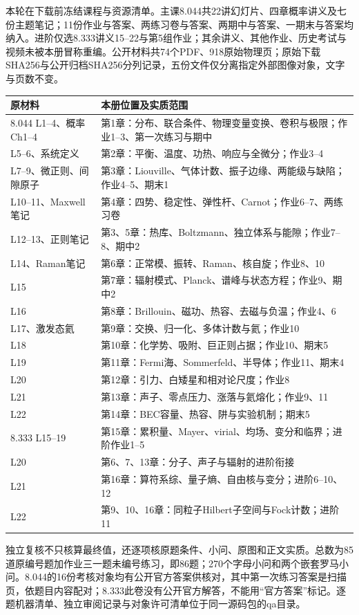 本轮在下载前冻结课程与资源清单。主课8.044共22讲幻灯片、四章概率讲义及七份主题笔记；11份作业与答案、两练习卷与答案、两期中与答案、一期末与答案均纳入。进阶仅选8.333讲义15--22与第5组作业；其余讲义、其他作业、历史考试与视频未被本册冒称重编。公开材料共74个PDF、918原始物理页；原始下载SHA256与公开归档SHA256分列记录，五份文件仅分离指定外部图像对象，文字与页数不变。

\begin{longtable}{p{}p{}}
\toprule 原材料 & 本册位置及实质范围\\\midrule\endhead
8.044 L1--4、概率Ch1--4 & 第1章：分布、联合条件、物理变量变换、卷积与极限；作业1--3、第一次练习与期中\\
L5--6、系统定义 & 第2章：平衡、温度、功热、响应与全微分；作业3--4\\
L7--9、微正则、间隙原子 & 第3章：Liouville、气体计数、振子边缘、两能级与缺陷；作业4--5、期末1\\
L10--11、Maxwell笔记 & 第4章：四势、稳定性、弹性杆、Carnot；作业6--7、两练习卷\\
L12--13、正则笔记 & 第3、5章：热库、Boltzmann、独立体系与能隙；作业7--8、期中2\\
L14、Raman笔记 & 第6章：正常模、振转、Raman、核自旋；作业8、10\\
L15 & 第7章：辐射模式、Planck、谱峰与状态方程；作业9、期中2\\
L16 & 第8章：Brillouin、磁功、热容、去磁与负温；作业4、6\\
L17、激发态氦 & 第9章：交换、归一化、多体计数与氦；作业10\\
L18 & 第10章：化学势、吸附、巨正则占据；作业10、期末5\\
L19 & 第11章：Fermi海、Sommerfeld、半导体；作业11、期末4\\
L20 & 第12章：引力、白矮星和相对论尺度；作业8\\
L21 & 第13章：声子、零点压力、涨落与氦熔化；作业9、11\\
L22 & 第14章：BEC容量、热容、阱与实验机制；期末5\\
8.333 L15--19 & 第15章：累积量、Mayer、virial、均场、变分和临界；进阶作业1--5\\
L20 & 第6、7、13章：分子、声子与辐射的进阶衔接\\
L21 & 第16章：算符系综、量子熵、自由核与变分；进阶6--10、12\\
L22 & 第9、10、16章：同粒子Hilbert子空间与Fock计数；进阶11\\\bottomrule
\end{longtable}
独立复核不只核算最终值，还逐项核原题条件、小问、原图和正文实质。总数为85道原编号题加作业三一题未编号练习，即86题；270个字母小问和两个嵌套罗马小问。8.044的16份考核对象均有公开官方答案供核对，其中第一次练习答案是扫描页，依题目内容配对；8.333此卷没有公开官方解答，不能用“官方答案”标记。逐题机器清单、独立审阅记录与对象许可清单位于同一源码包的qa目录。

